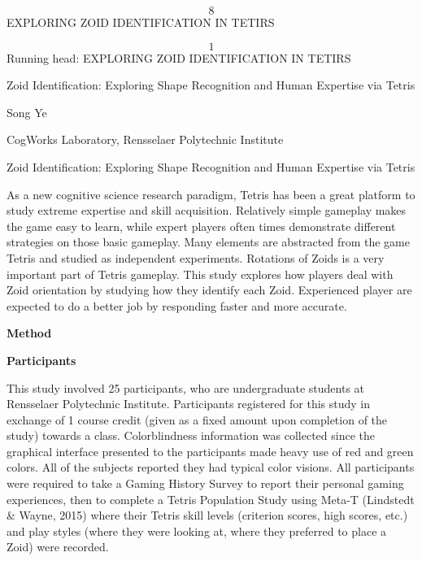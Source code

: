 \documentclass{article}
\begin{document}
	
	
	\noindent 
	
	\noindent 
	
	\noindent 
	
	\noindent 
	
	\noindent 
	
	\noindent 
	\[8\] 
	EXPLORING ZOID IDENTIFICATION IN TETIRS
	
	\noindent 
	\[1\] 
	Running head: EXPLORING ZOID IDENTIFICATION IN TETIRS
	
	\noindent 
	
	\noindent 
	
	\noindent Zoid Identification: Exploring Shape Recognition and Human Expertise via Tetris
	
	Song Ye
	
	\noindent CogWorks Laboratory, Rensselaer Polytechnic Institute
	
	
	
	\noindent \eject 
	
	\noindent Zoid Identification: Exploring Shape Recognition and Human Expertise via Tetris
	
	As a new cognitive science research paradigm, Tetris has been a great platform to study extreme expertise and skill acquisition. Relatively simple gameplay makes the game easy to learn, while expert players often times demonstrate different strategies on those basic gameplay. Many elements are abstracted from the game Tetris and studied as independent experiments. Rotations of Zoids is a very important part of Tetris gameplay. This study explores how players deal with Zoid orientation by studying how they identify each Zoid. Experienced player are expected to do a better job by responding faster and more accurate. 
	
	\noindent \textbf{Method}
	
	\noindent \textbf{Participants}
	
	\textbf{ }This study involved 25 participants, who are undergraduate students at Rensselaer Polytechnic Institute. Participants registered for this study in exchange of 1 course credit (given as a fixed amount upon completion of the study) towards a class. Colorblindness information was collected since the graphical interface presented to the participants made heavy use of red and green colors. All of the subjects reported they had typical color visions. All participants were required to take a Gaming History Survey to report their personal gaming experiences, then to complete a Tetris Population Study using Meta-T (Lindstedt \& Wayne, 2015) where their Tetris skill levels (criterion scores, high scores, etc.) and play styles (where they were looking at, where they preferred to place a Zoid) were recorded. 
	
\end{document}
